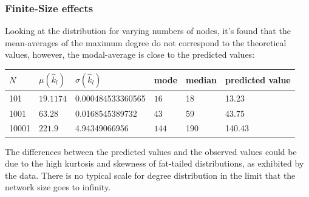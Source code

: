 \documentclass[twoside]{article}
\begin{document}
\subsubsection{Finite-Size effects}
Looking at the distribution for varying numbers of nodes, it's found that the mean-averages of the maximum degree do not correspond to the theoretical values, however, the modal-average is close to the predicted values:
\begin{center}
    \begin{tabular}{|   l|  l|   l|   l|   l|   l|}
    \hline
    $N$ & $\mu(\hat{k}_l)$ &$\sigma(\hat{k}_l)$ & mode & median & predicted value \\ \hline
    101 & $19.1174 $&0.000484533360565 & $16$ & 18&13.23 \\ \hline
    1001 & $63.28 $ &0.0168545389732& $43$& 59 & 43.75\\ \hline
    10001 &  $221.9 $ &4.94349066956& $144$&190 & 140.43\\ \hline
    \end{tabular}
\end{center}
The differences between the predicted values and the observed values could be due to the high kurtosis and skewness of fat-tailed distributions, as exhibited by the data. There is no typical scale for degree distribution in the limit that the network size goes to infinity.
\end{document}
